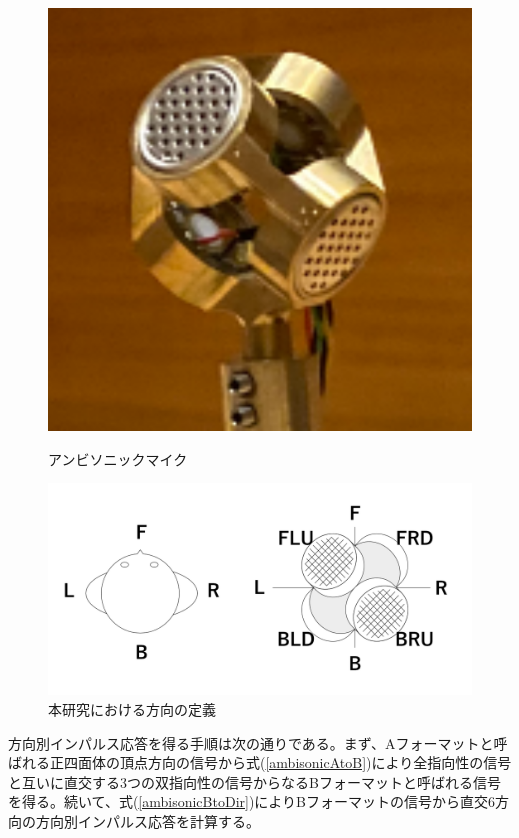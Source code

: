 \documentclass[11pt,a4j]{jreport}
\begin{document}
\begin{figure}[H]
  \begin{minipage}[b]{.33\textwidth}
      \centering
      \includegraphics[width=.8\linewidth]{images/ambisonicMic.png}
      \caption{アンビソニックマイク}
      \label{fig:アンビソニックマイク}
  \end{minipage}%
  \begin{minipage}[b]{.66\textwidth}
      \centering
      \includegraphics[width=.8\linewidth]{images/ambisonicMicDirectionDef.png}
      \caption{本研究における方向の定義}
      \label{fig:方向の定義}
  \end{minipage}
\end{figure}

方向別インパルス応答を得る手順は次の通りである。まず、Aフォーマットと呼ばれる正四面体の頂点方向の信号から式(\ref{ambisonicAtoB})により全指向性の信号と互いに直交する3つの双指向性の信号からなるBフォーマットと呼ばれる信号を得る。続いて、式(\ref{ambisonicBtoDir})によりBフォーマットの信号から直交6方向の方向別インパルス応答を計算する。
\end{document}
